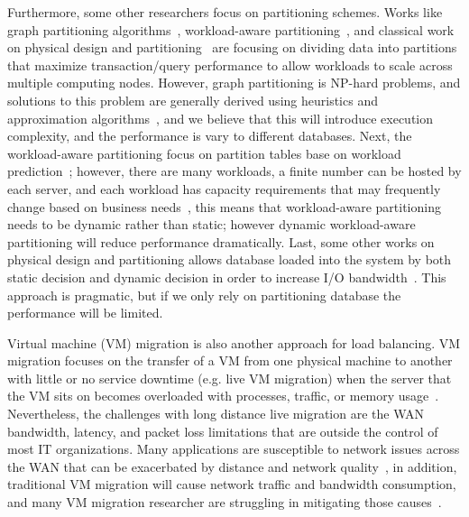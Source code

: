 Furthermore, some other researchers focus on partitioning schemes. Works like graph partitioning algorithms~\cite{Karypis:1998:FHQ:305219.305248}, workload-aware partitioning~\cite{Scholl:2009:WDP:1516360.1516366}, and classical work on physical design and partitioning~\cite{Zilio:1998:PDD:928651} are focusing on dividing data into partitions that maximize transaction/query performance to allow workloads to scale across multiple computing nodes. However, graph partitioning is NP-hard problems, and solutions to this problem are generally derived using heuristics and approximation algorithms~\cite{citeulike:11192678}, and we believe that this will introduce execution complexity, and the performance is vary to different databases. Next, the workload-aware partitioning focus on partition tables base on workload prediction~\cite{Scholl:2009:WDP:1516360.1516366, Mit-Shinobi}; however, there are many workloads, a ﬁnite number can be hosted by each server, and each workload has capacity requirements that may frequently change based on business needs~\cite{Gmach:2007:WAD:1524302.1524818}, this means that workload-aware partitioning needs to be dynamic rather than static; however dynamic workload-aware partitioning will reduce performance dramatically. Last, some other works on physical design and partitioning allows database loaded into the system by both static decision and dynamic decision in order to increase I/O bandwidth~\cite{Zilio:1998:PDD:928651}. This approach is pragmatic, but if we only rely on partitioning database the performance will be limited.
 
Virtual machine (VM) migration is also another approach for load balancing. VM migration focuses on the transfer of a VM from one physical machine to another with little or no service downtime (e.g. live VM migration) when the server that the VM sits on becomes overloaded with processes, traffic, or memory usage~\cite{Clark:2005:LMV:1251203.1251223}. Nevertheless, the challenges with long distance live migration are the WAN bandwidth, latency, and packet loss limitations that are outside the control of most IT organizations. Many applications are susceptible to network issues across the WAN that can be exacerbated by distance and network quality~\cite{murphyVMWare}, in addition, traditional VM migration will cause network traffic and bandwidth consumption, and many VM migration researcher are struggling in mitigating those causes~\cite{Liu:2009:LMV:1551609.1551630}.

